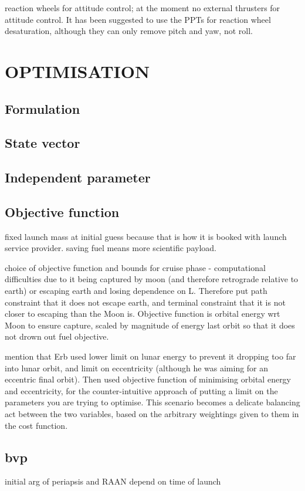 reaction wheels for attitude control; at the moment no external thrusters for attitude control. It has been suggested to use the PPTs for reaction wheel desaturation, although they can only remove pitch and yaw, not roll.


\section{OPTIMISATION}
\subsection{Formulation}
\subsection{State vector}
\subsection{Independent parameter}
\subsection{Objective function}
fixed launch mass at initial guess because that is how it is booked with launch service provider. saving fuel means more scientific payload.

choice of objective function and bounds for cruise phase - computational difficulties due to it being captured by moon (and therefore retrograde relative to earth) or escaping earth and losing dependence on L. Therefore put path constraint that it does not escape earth, and terminal constraint that it is not closer to escaping than the Moon is. Objective function is orbital energy wrt Moon to ensure capture, scaled by magnitude of energy last orbit so that it does not drown out fuel objective.

mention that Erb used lower limit on lunar energy to prevent it dropping too far into lunar orbit, and limit on eccentricity (although he was aiming for an eccentric final orbit). Then used objective function of minimising orbital energy and eccentricity, for the counter-intuitive approach of putting a limit on the parameters you are trying to optimise. This scenario becomes a delicate balancing act between the two variables, based on the arbitrary weightings given to them in the cost function.

\subsection{bvp}
initial arg of periapsis and RAAN depend on time of launch


